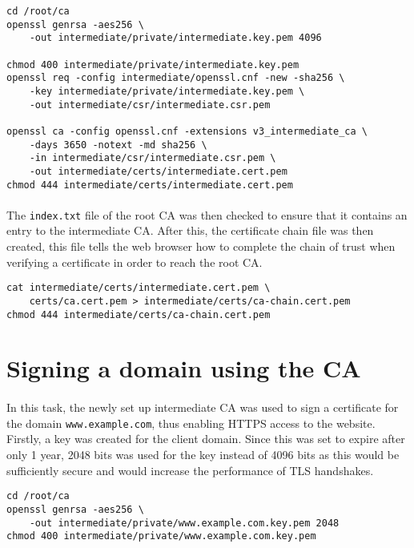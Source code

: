 \begin{verbatim}
cd /root/ca
openssl genrsa -aes256 \
    -out intermediate/private/intermediate.key.pem 4096

chmod 400 intermediate/private/intermediate.key.pem
openssl req -config intermediate/openssl.cnf -new -sha256 \
    -key intermediate/private/intermediate.key.pem \
    -out intermediate/csr/intermediate.csr.pem
    
openssl ca -config openssl.cnf -extensions v3_intermediate_ca \
    -days 3650 -notext -md sha256 \
    -in intermediate/csr/intermediate.csr.pem \
    -out intermediate/certs/intermediate.cert.pem
chmod 444 intermediate/certs/intermediate.cert.pem
\end{verbatim}

\paragraph{ }The \texttt{index.txt} file of the root CA was then checked to ensure that it contains an entry to the intermediate CA. After this, the certificate chain file was then created, this file tells the web browser how to complete the chain of trust when verifying a certificate in order to reach the root CA.

\begin{verbatim}
cat intermediate/certs/intermediate.cert.pem \
    certs/ca.cert.pem > intermediate/certs/ca-chain.cert.pem
chmod 444 intermediate/certs/ca-chain.cert.pem
\end{verbatim}

\section{Signing a domain using the CA}
\paragraph{ }In this task, the newly set up intermediate CA was used to sign a certificate for the domain \texttt{www.example.com}, thus enabling HTTPS access to the website. Firstly, a key was created for the client domain. Since this was set to expire after only 1 year, 2048 bits was used for the key instead of 4096 bits as this would be sufficiently secure and would increase the performance of TLS handshakes.

\begin{verbatim}
cd /root/ca
openssl genrsa -aes256 \
    -out intermediate/private/www.example.com.key.pem 2048
chmod 400 intermediate/private/www.example.com.key.pem
\end{verbatim}

